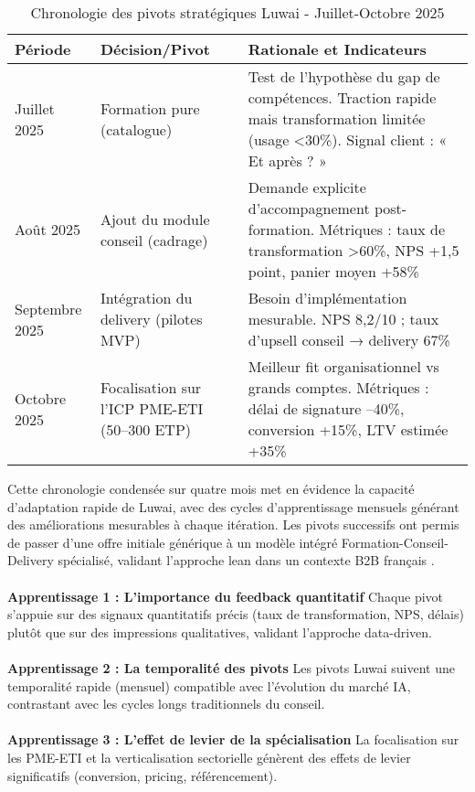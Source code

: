 \begin{table}[ht]
\centering
\caption{Chronologie des pivots stratégiques Luwai - Juillet-Octobre 2025}
\label{tab:luwai_pivots}
\begin{tabular}{@{}p{3cm}p{6cm}p{6cm}@{}}
\toprule
\textbf{Période} & \textbf{Décision/Pivot} & \textbf{Rationale et Indicateurs} \\
\midrule
Juillet 2025 & Formation pure (catalogue) & Test de l’hypothèse du gap de compétences. Traction rapide mais transformation limitée (usage <30\%). Signal client : « Et après ? » \\
Août 2025 & Ajout du module conseil (cadrage) & Demande explicite d’accompagnement post-formation. Métriques : taux de transformation >60\%, NPS +1,5 point, panier moyen +58\% \\
Septembre 2025 & Intégration du delivery (pilotes MVP) & Besoin d’implémentation mesurable. NPS 8,2/10 ; taux d’upsell conseil → delivery 67\% \\
Octobre 2025 & Focalisation sur l’ICP PME-ETI (50–300 ETP) & Meilleur fit organisationnel vs grands comptes. Métriques : délai de signature –40\%, conversion +15\%, LTV estimée +35\% \\
\bottomrule
\end{tabular}
\end{table}
\medskip
Cette chronologie condensée sur quatre mois met en évidence la capacité d'adaptation rapide de Luwai, avec des cycles d'apprentissage mensuels générant des améliorations mesurables à chaque itération. Les pivots successifs ont permis de passer d'une offre initiale générique à un modèle intégré Formation-Conseil-Delivery spécialisé, validant l'approche lean dans un contexte B2B français \cite{ries2011lean}.
\\\\
\textbf{Apprentissage 1 : L'importance du feedback quantitatif}
Chaque pivot s'appuie sur des signaux quantitatifs précis (taux de transformation, NPS, délais) plutôt que sur des impressions qualitatives, validant l'approche data-driven.
\\\\
\textbf{Apprentissage 2 : La temporalité des pivots}
Les pivots Luwai suivent une temporalité rapide (mensuel) compatible avec l'évolution du marché IA, contrastant avec les cycles longs traditionnels du conseil.
\\\\
\textbf{Apprentissage 3 : L'effet de levier de la spécialisation}
La focalisation sur les PME-ETI et la verticalisation sectorielle génèrent des effets de levier significatifs (conversion, pricing, référencement).

